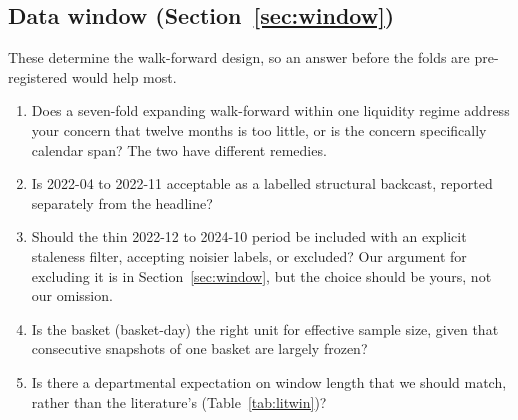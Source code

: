 \documentclass[11pt,a4paper]{article}
\begin{document}
\subsection{Data window (Section~\ref{sec:window})}
These determine the walk-forward design, so an answer before the folds are
pre-registered would help most.
\begin{enumerate}
  \item Does a seven-fold expanding walk-forward within one liquidity regime
    address your concern that twelve months is too little, or is the concern
    specifically calendar span? The two have different remedies.
  \item Is 2022-04 to 2022-11 acceptable as a labelled structural backcast,
    reported separately from the headline?
  \item Should the thin 2022-12 to 2024-10 period be included with an explicit
    staleness filter, accepting noisier labels, or excluded? Our argument for
    excluding it is in Section~\ref{sec:window}, but the choice should be yours,
    not our omission.
  \item Is the basket (basket-day) the right unit for effective sample size,
    given that consecutive snapshots of one basket are largely frozen?
  \item Is there a departmental expectation on window length that we should
    match, rather than the literature's (Table~\ref{tab:litwin})?
\end{enumerate}
\end{document}
